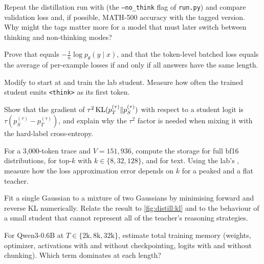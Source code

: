 \begin{exercise}\label{ex:distill:nothink}
Repeat the distillation run with  (the \texttt{--no\_think} flag of
\texttt{run.py}) and compare validation loss and, if possible, MATH-500 accuracy with the tagged
version. Why might the tags matter more for a model that must later switch between thinking and
non-thinking modes?
\end{exercise}

\begin{exercise}
Prove that  equals $-\frac{1}{n}\log p_\theta(y\mid x)$, and that the
token-level batched loss equals the average of per-example losses if and only if all answers have
the same length.
\end{exercise}

\begin{exercise}
Modify  to start at  and train the lab student. Measure
how often the trained student emits \texttt{<think>} as its first token.
\end{exercise}

\begin{exercise}[KD temperature]
Show that the gradient of $\tau^2\operatorname{KL}(p_T^{(\tau)}\|p_S^{(\tau)})$ with respect to a student logit
is $\tau(p_S^{(\tau)}-p_T^{(\tau)})$, and explain why the $\tau^2$ factor is needed when mixing it
with the hard-label cross-entropy.
\end{exercise}

\begin{exercise}
For a 3{,}000-token trace and $V=151{,}936$, compute the storage for full bf16 distributions, for
top-$k$ with $k\in\{8,32,128\}$, and for text. Using the lab's , measure how
the loss approximation error depends on $k$ for a peaked and a flat teacher.
\end{exercise}

\begin{exercise}
Fit a single Gaussian to a mixture of two Gaussians by minimising forward and reverse KL
numerically. Relate the result to \cref{fig:distill:kl} and to the behaviour of a small student
that cannot represent all of the teacher's reasoning strategies.
\end{exercise}

\begin{exercise}
For Qwen3-0.6B at $T\in\{2\text{k},8\text{k},32\text{k}\}$, estimate total training memory
(weights, optimizer, activations with and without checkpointing, logits with and without
chunking). Which term dominates at each length?
\end{exercise}

